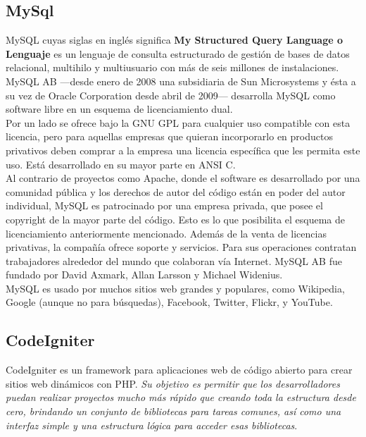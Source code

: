 \subsection{MySql}

MySQL cuyas siglas en inglés significa \textbf{My Structured Query Language o Lenguaje} es un lenguaje de consulta estructurado de gestión de bases de datos relacional, multihilo y multiusuario con más de seis millones de instalaciones. MySQL AB —desde enero de 2008 una subsidiaria de Sun Microsystems y ésta a su vez de Oracle Corporation desde abril de 2009— desarrolla MySQL como software libre en un esquema de licenciamiento dual.\\

Por un lado se ofrece bajo la GNU GPL para cualquier uso compatible con esta licencia, pero para aquellas empresas que quieran incorporarlo en productos privativos deben comprar a la empresa una licencia específica que les permita este uso. Está desarrollado en su mayor parte en ANSI C.\\

Al contrario de proyectos como Apache, donde el software es desarrollado por una comunidad pública y los derechos de autor del código están en poder del autor individual, MySQL es patrocinado por una empresa privada, que posee el copyright de la mayor parte del código. Esto es lo que posibilita el esquema de licenciamiento anteriormente mencionado. Además de la venta de licencias privativas, la compañía ofrece soporte y servicios. Para sus operaciones contratan trabajadores alrededor del mundo que colaboran vía Internet. MySQL AB fue fundado por David Axmark, Allan Larsson y Michael Widenius.\\

MySQL es usado por muchos sitios web grandes y populares, como Wikipedia, Google (aunque no para búsquedas), Facebook, Twitter, Flickr, y YouTube.

\subsection{CodeIgniter}

CodeIgniter es un framework para aplicaciones web de código abierto para crear sitios web dinámicos con PHP. \textit{Su objetivo es permitir que los desarrolladores puedan realizar proyectos mucho más rápido que creando toda la estructura desde cero, brindando un conjunto de bibliotecas para tareas comunes, así como una interfaz simple y una estructura lógica para acceder esas bibliotecas}.\\

